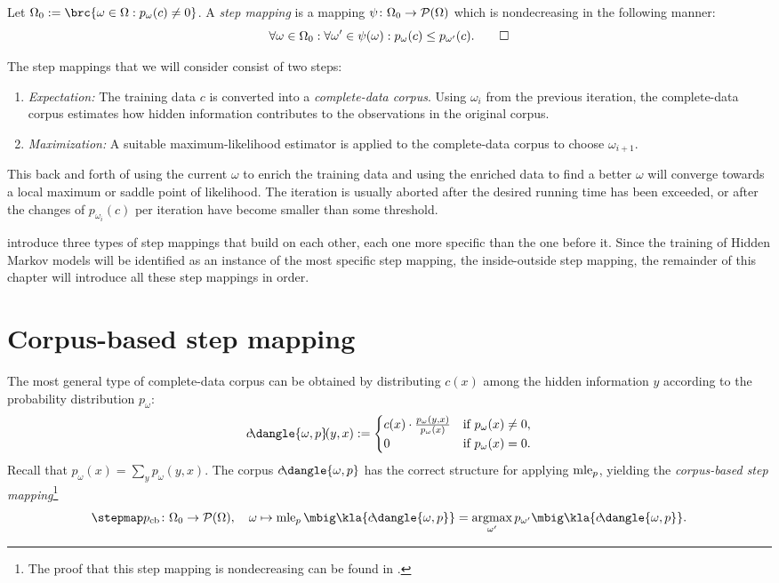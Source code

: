 \begin{definition}
 Let $\Omega_0 := \brc{\omega\in\Omega: p_\omega(c) \neq 0}$. A \emph{step
 mapping} is a mapping $\psi\colon\Omega_0\to\mathcal P(\Omega)$ which is nondecreasing in
 the following manner:
 \[
  \forall \omega\in\Omega_0: \forall \omega'\in\psi(\omega): p_\omega(c) \leq p_{\omega'}(c). \qedhere
 \]
\end{definition}

The step mappings that we will consider consist of two steps:
\begin{enumerate}
 \item \emph{Expectation:} The training data $c$ is converted into a
  \emph{complete-data corpus}. Using $\omega_i$ from the previous
  iteration, the complete-data corpus estimates how hidden information
  contributes to the observations in the original corpus.
 \item \emph{Maximization:} A suitable maximum-likelihood estimator is applied
  to the complete-data corpus to choose $\omega_{i+1}$.
\end{enumerate}

This back and forth of using the current $\omega$ to enrich the training data
and using the enriched data to find a better $\omega$ will converge towards a
local maximum or saddle point of likelihood. \cite[Thm.~2]{Wu1983} The
iteration is usually aborted after the desired running time has been exceeded,
or after the changes of $p_{\omega_i}(c)$ per iteration have become smaller
than some threshold.

\cite{bucstuvog15} introduce three types of step mappings that build on each
other, each one more specific than the one before it. Since the training of
Hidden Markov models will be identified as an instance of the most specific
step mapping, the inside-outside step mapping, the remainder of this chapter
will introduce all these step mappings in order.

\section{Corpus-based step mapping}

The most general type of complete-data corpus can be obtained by distributing
$c(x)$ among the hidden information $y$ according to the probability
distribution $p_\omega$:
\[
 c\!\dangle{\omega,p}\!(y,x) := \begin{cases}
  c(x) \cdot \frac{p_\omega(y,x)}{p_\omega(x)} & \text{if } p_\omega(x) \neq 0, \\
  0 & \text{if } p_\omega(x) = 0.
 \end{cases}
\]
Recall that $p_\omega(x) = \sum_y p_\omega(y,x)$. The corpus
$c\!\dangle{\omega,p}$ has the correct structure for applying $\operatorname{mle}_p$,
yielding the \emph{corpus-based step mapping}\footnote{The proof that this step
mapping is nondecreasing can be found in \cite[pp.~10]{bucstuvog15}.}
\[
 \stepmap p_\mathrm{cb}\colon \Omega_0\to\up(\Omega),
 \quad
 \omega \mapsto \mle_p\mbig\kla{c\!\dangle{\omega,p}} = \argmax_{\omega'} p_{\omega'}\mbig\kla{c\!\dangle{\omega,p}}.
\]


